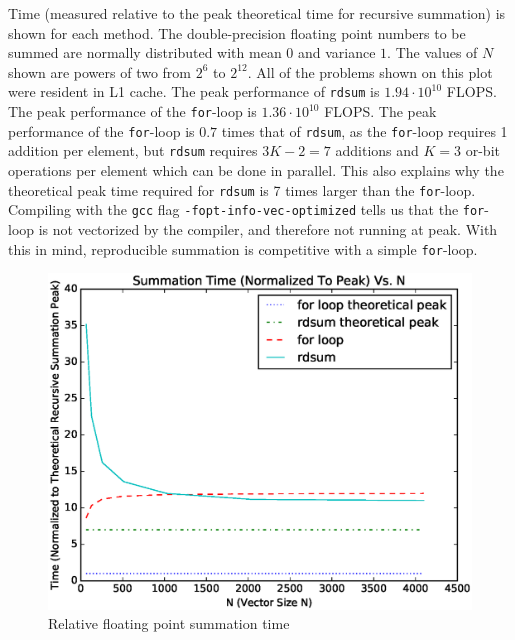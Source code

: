   Time (measured relative to the peak theoretical time for recursive summation)
  is shown for each method. The double-precision floating point numbers to be
  summed are normally distributed with mean $0$ and variance $1$. The values of
  $N$ shown are powers of two from $2^6$ to $2^{12}$. All of the problems shown
  on this plot were resident in L1 cache. The peak performance of \texttt{rdsum}
  is $1.94\cdot 10^{10}$ FLOPS. The peak performance of the \texttt{for}-loop is
  $1.36\cdot 10^{10}$ FLOPS. The peak performance of the \texttt{for}-loop is
  $0.7$ times that of \texttt{rdsum}, as the \texttt{for}-loop requires 1
  addition per element, but \texttt{rdsum} requires $3K - 2 = 7$ additions and $K
  = 3$ or-bit operations per element which can be done in parallel. This also
  explains why the theoretical peak time required for \texttt{rdsum} is 7 times
  larger than the \texttt{for}-loop. Compiling with the \texttt{gcc} flag
  \texttt{-fopt-info-vec-optimized} tells us that the \texttt{for}-loop is not
  vectorized by the compiler, and therefore not running at peak. With this in
  mind, reproducible summation is competitive with a simple \texttt{for}-loop.
  \begin{figure}[H]
  \begin{center}
  \includegraphics[width=\textwidth]{plots/sum_comparison}
  \caption{Relative floating point summation time}
  \label{fig:forloop_timings}
  \end{center}
  \end{figure}
